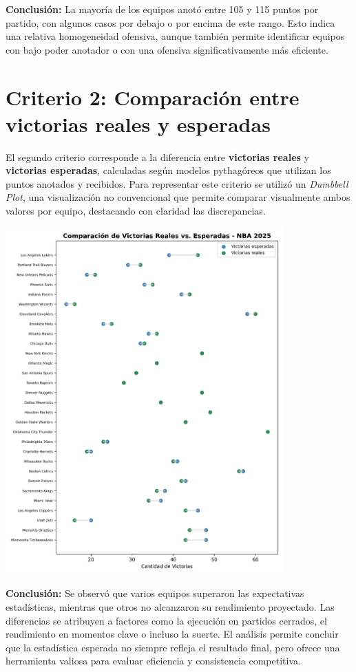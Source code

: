 \documentclass[12pt]{article}
\begin{document}
\textbf{Conclusi\'on:} La mayor\'ia de los equipos anot\'o entre 105 y 115 puntos por partido, con algunos casos por debajo o por encima de este rango. Esto indica una relativa homogeneidad ofensiva, aunque tambi\'en permite identificar equipos con bajo poder anotador o con una ofensiva significativamente m\'as eficiente.

\section*{Criterio 2: Comparaci\'on entre victorias reales y esperadas}

El segundo criterio corresponde a la diferencia entre \textbf{victorias reales} y \textbf{victorias esperadas}, calculadas seg\'un modelos pythag\'oreos que utilizan los puntos anotados y recibidos. Para representar este criterio se utiliz\'o un \textit{Dumbbell Plot}, una visualizaci\'on no convencional que permite comparar visualmente ambos valores por equipo, destacando con claridad las discrepancias.

\begin{center}
    \includegraphics[width=0.8\textwidth]{dumbbell_plot_nba2025_victorias.png}
\end{center}

\textbf{Conclusi\'on:} Se observ\'o que varios equipos superaron las expectativas estad\'isticas, mientras que otros no alcanzaron su rendimiento proyectado. Las diferencias se atribuyen a factores como la ejecuci\'on en partidos cerrados, el rendimiento en momentos clave o incluso la suerte. El an\'alisis permite concluir que la estad\'istica esperada no siempre refleja el resultado final, pero ofrece una herramienta valiosa para evaluar eficiencia y consistencia competitiva.
\end{document}
